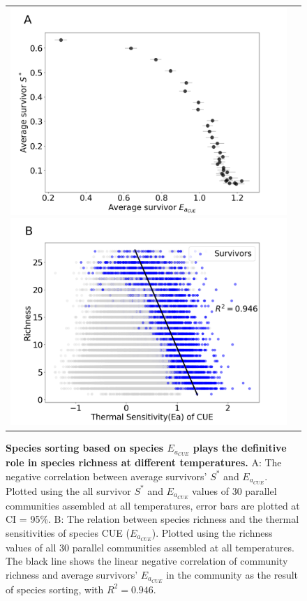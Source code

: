 \documentclass[11pt, a4paper]{article}
\begin{document}
\begin{spacing}{1.5}
\begin{figure}
    \centering
    \begin{tabular}{c@{}c@{}}
        \includegraphics[scale=0.27]{./Figures/Eadiff_fitdiff.png}
        \includegraphics[scale=0.27]{./Figures/EaCUE_richness.png}
    \end{tabular}
    \caption{\textbf{Species sorting based on species $E_{a_{CUE}}$ plays the definitive role in species richness at different temperatures.} A: The negative correlation between average survivors' $S^*$ and $E_{a_{CUE}}$. Plotted using the all survivor $S^*$ and $E_{a_{CUE}}$ values of 30 parallel communities assembled at all temperatures, error bars are plotted at CI = 95\%. B: The relation between species richness and the thermal sensitivities of species CUE ($E_{a_{CUE}}$). Plotted using the richness values of all 30 parallel communities assembled at all temperatures. The black line shows the linear negative correlation of community richness and average survivors' $E_{a_{CUE}}$ in the community as the result of species sorting, with $R^2 = 0.946$.}
    \label{fig:EaCUE}
\end{figure}


\end{spacing}
\end{document}
